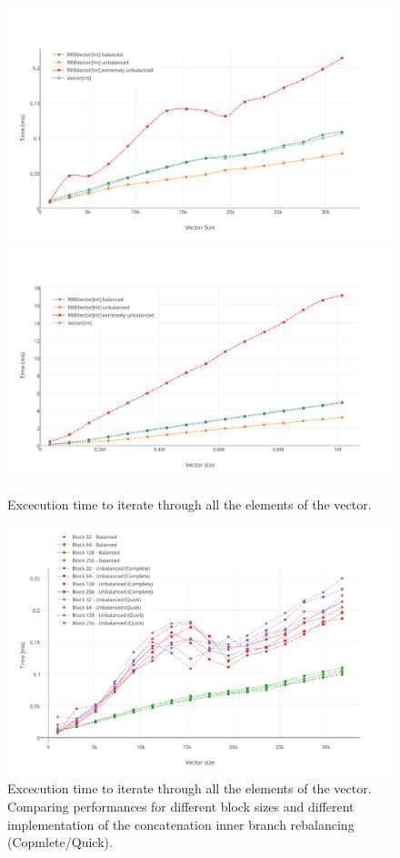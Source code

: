 \begin{figure}[h!]
  \centering
  \includegraphics[width=\textwidth]{Benchmarks/Iteration_3.pdf}
  \includegraphics[width=\textwidth]{Benchmarks/Iteration_4.pdf}
  \label{IterationBenchmarks}
  \caption{Excecution time to iterate through all the elements of the vector.}
\end{figure}

\begin{figure}[h!]
  \centering
  \label{IterationBlocksBenchmarks}
  \includegraphics[width=\textwidth]{Benchmarks/Iteration_blocks_3.pdf}
  \caption{Excecution time to iterate through all the elements of the vector. Comparing performances for different block sizes and different implementation of the concatenation inner branch rebalancing (Copmlete/Quick).}
\end{figure}

